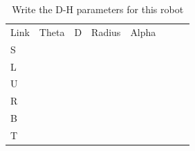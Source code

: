 \documentclass{article}
\begin{document}
\begin{table}
	\caption{Write the D-H parameters for this robot}
	\begin{tabular}[t]{lccccccc}
		Link & Theta & D 	  & Radius & Alpha \\ 
		S 	 & 	     &        &        &       \\	
		L 	 & 	     &        &        &       \\	
		U 	 & 	     &        &        &       \\	
		R 	 & 	     &        &        &       \\	
		B 	 & 	     &        &        &       \\	
		T 	 & 	     &        &        &       \\	
	\end{tabular}
\end{table}
\newpage
\end{document}
